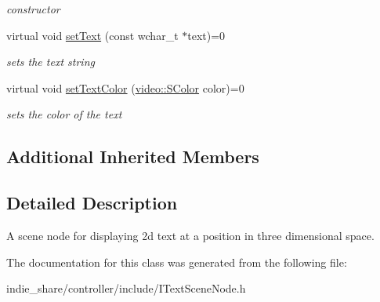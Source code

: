 \begin{DoxyCompactItemize}
\begin{DoxyCompactList}\small\item\em constructor \end{DoxyCompactList}\item 
\mbox{\label{classirr_1_1scene_1_1ITextSceneNode_a398822c1a3ca68bbd171ab1534d69aa2}} 
virtual void \hyperlink{classirr_1_1scene_1_1ITextSceneNode_a398822c1a3ca68bbd171ab1534d69aa2}{set\+Text} (const wchar\+\_\+t $\ast$text)=0
\begin{DoxyCompactList}\small\item\em sets the text string \end{DoxyCompactList}\item 
\mbox{\label{classirr_1_1scene_1_1ITextSceneNode_af1d914bc036c54e060b1673e922083dd}} 
virtual void \hyperlink{classirr_1_1scene_1_1ITextSceneNode_af1d914bc036c54e060b1673e922083dd}{set\+Text\+Color} (\hyperlink{classirr_1_1video_1_1SColor}{video\+::\+S\+Color} color)=0
\begin{DoxyCompactList}\small\item\em sets the color of the text \end{DoxyCompactList}\end{DoxyCompactItemize}
\subsection*{Additional Inherited Members}


\subsection{Detailed Description}
A scene node for displaying 2d text at a position in three dimensional space. 

The documentation for this class was generated from the following file\+:\begin{DoxyCompactItemize}
\item 
indie\+\_\+share/controller/include/I\+Text\+Scene\+Node.\+h\end{DoxyCompactItemize}
